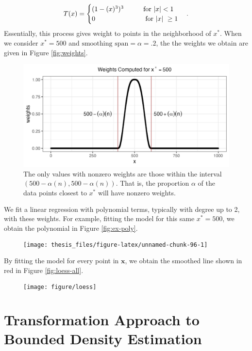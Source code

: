 \documentclass[12pt,twoside]{smiththesis}
\begin{document}
\[
T(x) = \begin{cases} (1-(x)^3)^3 \hspace{9 mm}  \text{ for } |x| < 1\\
0  \hspace{25 mm} \text{ for $|x|$ } \geq 1 \end{cases}.
\]
Essentially, this process gives weight to points in the neighborhood of \(x^*\). When we consider \(x^* = 500\) and \(\text{smoothing span} = \alpha = .2\), the the weights we obtain are given in Figure \ref{fig:weights}.
\begin{figure}

{\centering \includegraphics[width=1\linewidth]{figure/weights} 

}

\caption{\label{fig:weights} The only values with nonzero weights are those within the interval $(500 - \alpha (n), 500 - \alpha (n))$. That is, the proportion $\alpha$ of the data points closest to $x^*$ will have nonzero weights.}\label{fig:unnamed-chunk-95}
\end{figure}
We fit a linear regression with polynomial terms, typically with degree up to 2, with these weights. For example, fitting the model for this same \(x^*=500\), we obtain the polynomial in Figure \ref{fig:ex-poly}.
\begin{figure}

{\centering \texttt{[image: thesis\_files/figure-latex/unnamed-chunk-96-1]} 

}

\caption{\label{fig:ex-poly}}\label{fig:unnamed-chunk-96}
\end{figure}
By fitting the model for every point in \(\mathbf x\), we obtain the smoothed line shown in red in Figure \ref{fig:loess-all}.
\begin{figure}

{\centering \texttt{[image: figure/loess]} 

}

\caption{\label{fig:loess-all}}\label{fig:unnamed-chunk-98}
\end{figure}
\hypertarget{bounded-density-transform}{%
\section{Transformation Approach to Bounded Density Estimation}\label{bounded-density-transform}}
\end{document}
